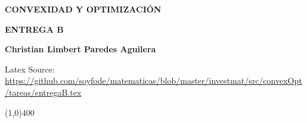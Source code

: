 \begin{center}
\textbf{CONVEXIDAD Y OPTIMIZACIÓN}

\textbf{\Large ENTREGA B}

\textbf{ \textbf{Christian Limbert Paredes Aguilera}}
\end{center}
\begin{center}
    Latex Source: \url{https://github.com/soyfode/matematicas/blob/master/investmat/src/convexOpt/tareas/entregaB.tex}
\end{center}

\line(1,0){400}

\begin{enumerate}

\setcounter{enumi}{2}

\begin{comment}
    \item \textbf{\boldmath Se considera el problemas
    $$
    \begin{array}{ll}
	\text{minimiza} & x^2+1\\
	\text{sujeto a} & (x-2)(x-4)\leq 0,
    \end{array}
    $$
    con $x\in \mathbb{R}$.}
    \begin{enumerate}[\bfseries (a)]

	\item \textbf{\boldmath Describe el conjunto accesible, el valor óptimo y las solución optima.}\\
	

	    \textbf{solución:} El conjunto accesible, esta formado por todos los valores de $x$ que satisfacen
	    $$ (x-2)(x-4)\leq 0.$$
	    Esto significa que $x$ deber estar en el intervalo $[2,4]$. Ya que, si $x<2$ o $x>4$, entonces $(x-2)(x-4)>0$.\\
	    
	    Para calcular el valor óptimo del problema de optimización dado, necesitamos encontrar el valor mínimo de la función objetivo $x^2+1$ sujeto a la restricción $(x-2)(x-4)\leq 0$.\\

	    La función objetivo $x^2+1$ es una función cuadrática que es siempre creciente en el intervalo $[2,4]$. Por lo tanto, el valor mínimo de la función objetivo en este intervalo se alcanza en el extremo inferior del intervalo. Es decir, la solución optima es 
	    $$x=2.$$

	    Sustituyendo $x=2$ en la función objetivo obtenemos el valor óptimo:
	    $$x^2+1 = 2^2+1 = 5.$$


\end{comment}
\end{enumerate}
